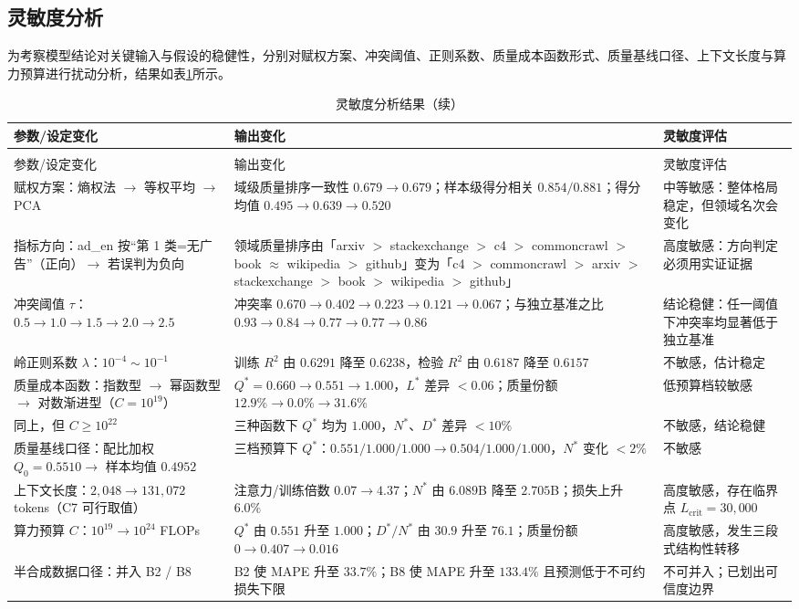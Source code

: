 \subsection{灵敏度分析}

为考察模型结论对关键输入与假设的稳健性，分别对赋权方案、冲突阈值、正则系数、质量成本函数形式、质量基线口径、上下文长度与算力预算进行扰动分析，结果如表\ref{tab:sensitivity}所示。

\begin{longtable}{>{\raggedright\arraybackslash}p{}>{\raggedright\arraybackslash}p{}>{\raggedright\arraybackslash}p{}}
  \caption{灵敏度分析结果}
  \label{tab:sensitivity} \\
  \toprule
  参数/设定变化 & 输出变化 & 灵敏度评估 \\
  \midrule
  \endfirsthead
  \caption{灵敏度分析结果（续）} \\
  \toprule
  参数/设定变化 & 输出变化 & 灵敏度评估 \\
  \midrule
  \endhead
  \bottomrule
  \endfoot
  赋权方案：熵权法 $\to$ 等权平均 $\to$ PCA & 域级质量排序一致性 $0.679\to0.679$；样本级得分相关 $0.854/0.881$；得分均值 $0.495\to0.639\to0.520$ & 中等敏感：整体格局稳定，但领域名次会变化 \\
  指标方向：ad\_en 按“第 1 类=无广告”（正向）$\to$ 若误判为负向 & 领域质量排序由「arxiv $>$ stackexchange $>$ c4 $>$ commoncrawl $>$ book $\approx$ wikipedia $>$ github」变为「c4 $>$ commoncrawl $>$ arxiv $>$ stackexchange $>$ book $>$ wikipedia $>$ github」 & 高度敏感：方向判定必须用实证证据 \\
  冲突阈值 $\tau$：$0.5\to1.0\to1.5\to2.0\to2.5$ & 冲突率 $0.670\to0.402\to0.223\to0.121\to0.067$；与独立基准之比 $0.93\to0.84\to0.77\to0.77\to0.86$ & 结论稳健：任一阈值下冲突率均显著低于独立基准 \\
  岭正则系数 $\lambda$：$10^{-4}\sim10^{-1}$ & 训练 $R^2$ 由 $0.6291$ 降至 $0.6238$，检验 $R^2$ 由 $0.6187$ 降至 $0.6157$ & 不敏感，估计稳定 \\
  质量成本函数：指数型 $\to$ 幂函数型 $\to$ 对数渐进型（$C=10^{19}$） & $Q^{*}=0.660\to0.551\to1.000$，$L^{*}$ 差异 $<0.06$；质量份额 $12.9\%\to0.0\%\to31.6\%$ & 低预算档较敏感 \\
  同上，但 $C\ge10^{22}$ & 三种函数下 $Q^{*}$ 均为 $1.000$，$N^{*}$、$D^{*}$ 差异 $<10\%$ & 不敏感，结论稳健 \\
  质量基线口径：配比加权 $Q_0=0.5510\to$ 样本均值 $0.4952$ & 三档预算下 $Q^{*}$：$0.551/1.000/1.000\to0.504/1.000/1.000$，$N^{*}$ 变化 $<2\%$ & 不敏感 \\
  上下文长度：$2{,}048\to131{,}072$ tokens（C7 可行取值） & 注意力/训练倍数 $0.07\to4.37$；$N^{*}$ 由 $6.089$B 降至 $2.705$B；损失上升 $6.0\%$ & 高度敏感，存在临界点 $L_{\text{crit}}=30{,}000$ \\
  算力预算 $C$：$10^{19}\to10^{24}$ FLOPs & $Q^{*}$ 由 $0.551$ 升至 $1.000$；$D^*/N^*$ 由 $30.9$ 升至 $76.1$；质量份额 $0\to0.407\to0.016$ & 高度敏感，发生三段式结构性转移 \\
  半合成数据口径：并入 B2 / B8 & B2 使 MAPE 升至 $33.7\%$；B8 使 MAPE 升至 $133.4\%$ 且预测低于不可约损失下限 & 不可并入；已划出可信度边界 \\
\end{longtable}

